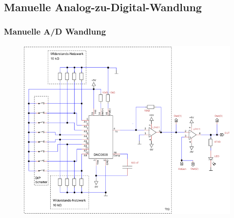 \subsection{Manuelle Analog-zu-Digital-Wandlung} %
\label{sub:Manuelle_Analog-zu-Digital-Wandlung}
\begin{frame}
    \frametitle{Manuelle A/D Wandlung}
    \framesubtitle{}
     \begin{figure}[H]
     \begin{center}
             \includegraphics[scale=0.35]{./img/schaltung/manuelle_dac_0.png}
     \end{center}
     \end{figure}
\end{frame}
